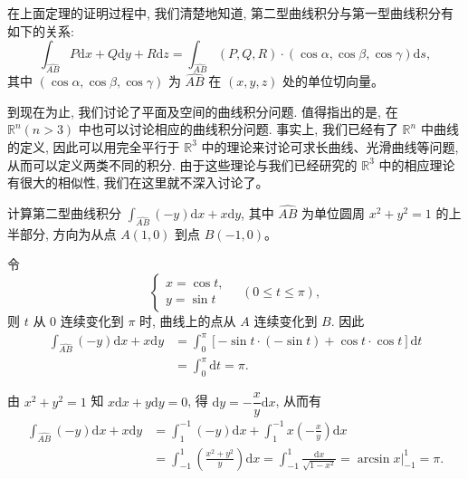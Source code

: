 \documentclass[12pt,fontset=fandol]{ctexart}
\begin{document}
\begin{remark}\quad 在上面定理的证明过程中, 我们清楚地知道, 第二型曲线积分与第一型曲线积分有如下的关系:
\[
  \int_{\widehat{AB}}P\mathrm dx+Q\mathrm dy+R\mathrm dz
  =\int_{\widehat{AB}}(P,Q,R)\cdot(\cos\alpha,\cos\beta,\cos\gamma)\mathrm ds,
\]
其中 $(\cos\alpha,\cos\beta,\cos\gamma)$ 为 $\widehat{AB}$ 在 $(x,y,z)$ 处的单位切向量。

到现在为止, 我们讨论了平面及空间的曲线积分问题. 值得指出的是, 在 $\mathbb R^n(n>3)$ 中也可以讨论相应的曲线积分问题. 事实上, 我们已经有了 $\mathbb R^n$ 中曲线的定义, 因此可以用完全平行于 $\mathbb R^3$ 中的理论来讨论可求长曲线、光滑曲线等问题, 从而可以定义两类不同的积分. 由于这些理论与我们已经研究的 $\mathbb R^3$ 中的相应理论有很大的相似性, 我们在这里就不深入讨论了。

\end{remark}
\begin{example}\label{course-example-16-2-1}\quad 计算第二型曲线积分 $\int_{\widehat{AB}}(-y)\mathrm dx+x\mathrm dy$, 其中 $\widehat{AB}$ 为单位圆周 $x^2+y^2=1$ 的上半部分, 方向为从点 $A(1,0)$ 到点 $B(-1,0)$。

\end{example}
\noindent{}\quad 令
\[
  \begin{cases}
    x=\cos t,\\
    y=\sin t
  \end{cases}
  \quad(0\leqslant t\leqslant\pi),
\]
则 $t$ 从 $0$ 连续变化到 $\pi$ 时, 曲线上的点从 $A$ 连续变化到 $B$. 因此
\[
\begin{aligned}
  \int_{\widehat{AB}}(-y)\mathrm dx+x\mathrm dy
  &=\int_0^\pi[-\sin t\cdot(-\sin t)+\cos t\cdot\cos t]\mathrm dt\\
  &=\int_0^\pi\mathrm dt=\pi.
\end{aligned}
\]

\noindent{}\quad 由 $x^2+y^2=1$ 知 $x\mathrm dx+y\mathrm dy=0$, 得 $\mathrm dy=-\dfrac{x}{y}\mathrm dx$, 从而有
\[
\begin{aligned}
  \int_{\widehat{AB}}(-y)\mathrm dx+x\mathrm dy
  &=\int_1^{-1}(-y)\mathrm dx+\int_1^{-1}x\left(-\frac{x}{y}\right)\mathrm dx\\
  &=\int_{-1}^1\left(\frac{x^2+y^2}{y}\right)\mathrm dx
    =\int_{-1}^1\frac{\mathrm dx}{\sqrt{1-x^2}}
    =\arcsin x\bigg|_{-1}^1=\pi.
\end{aligned}
\]
\end{document}
